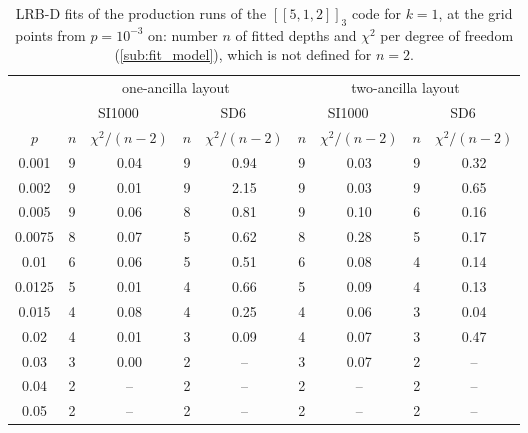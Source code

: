 \begin{table}[tp]
  \centering
  \small
  \begin{tabular}{c|cc|cc|cc|cc}
    \hline
    & \multicolumn{4}{c|}{one-ancilla layout} & \multicolumn{4}{c}{two-ancilla layout} \\
    & \multicolumn{2}{c|}{SI1000} & \multicolumn{2}{c|}{SD6} & \multicolumn{2}{c|}{SI1000} & \multicolumn{2}{c}{SD6} \\
    $p$ & $n$ & $\chi^2/(n-2)$ & $n$ & $\chi^2/(n-2)$ & $n$ & $\chi^2/(n-2)$ & $n$ & $\chi^2/(n-2)$ \\
    \hline
    0.001 & 9 & 0.04 & 9 & 0.94 & 9 & 0.03 & 9 & 0.32 \\
    0.002 & 9 & 0.01 & 9 & 2.15 & 9 & 0.03 & 9 & 0.65 \\
    0.005 & 9 & 0.06 & 8 & 0.81 & 9 & 0.10 & 6 & 0.16 \\
    0.0075 & 8 & 0.07 & 5 & 0.62 & 8 & 0.28 & 5 & 0.17 \\
    0.01 & 6 & 0.06 & 5 & 0.51 & 6 & 0.08 & 4 & 0.14 \\
    0.0125 & 5 & 0.01 & 4 & 0.66 & 5 & 0.09 & 4 & 0.13 \\
    0.015 & 4 & 0.08 & 4 & 0.25 & 4 & 0.06 & 3 & 0.04 \\
    0.02 & 4 & 0.01 & 3 & 0.09 & 4 & 0.07 & 3 & 0.47 \\
    0.03 & 3 & 0.00 & 2 & -- & 3 & 0.07 & 2 & -- \\
    0.04 & 2 & -- & 2 & -- & 2 & -- & 2 & -- \\
    0.05 & 2 & -- & 2 & -- & 2 & -- & 2 & -- \\
    \hline
  \end{tabular}
  \caption{LRB-D fits of the production runs of the $[[5,1,2]]_3$ code for $k = 1$, at the grid points from $p = 10^{-3}$ on: number $n$ of fitted depths and $\chi^2$ per degree of freedom (\autoref{sub:fit_model}), which is not defined for $n = 2$.}
  \label{tab:k1_depths}
\end{table}

